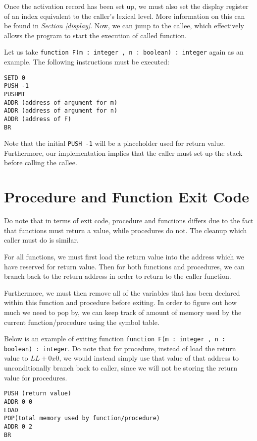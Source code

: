 \documentclass{article}
\begin{document}
Once the activation record has been set up, we must also set the display register of an index equivalent to the caller's lexical level. More information on this can be found in {\it Section \ref{display}}. Now, we can jump to the callee, which effectively allows the program to start the execution of called function.

Let us take {\tt function F(m : integer , n : boolean) : integer} again as an example. The following instructions must be executed:

\begin{lstlisting}
SETD 0
PUSH -1
PUSHMT
ADDR (address of argument for m)
ADDR (address of argument for n)
ADDR (address of F)
BR
\end{lstlisting}

Note that the initial {\tt PUSH -1} will be a placeholder used for return value. Furthermore, our implementation implies that the caller must set up the stack before calling the callee.

\section{Procedure and Function Exit Code} \label{exit}

Do note that in terms of exit code, procedure and functions differs due to the fact that functions must return a value, while procedures do not. The cleanup which caller must do is similar.

For all functions, we must first load the return value into the address which we have reserved for return value. Then for both functions and procedures, we can branch back to the return address in order to return to the caller function.

Furthermore, we must then remove all of the variables that has been declared within this function and procedure before exiting. In order to figure out how much we need to pop by, we can keep track of amount of memory used by the current function/procedure using the symbol table.

Below is an example of exiting function {\tt function F(m : integer , n : boolean) : integer}. Do note that for procedure, instead of load the return value to $LL + 0x0$, we would instead simply use that value of that address to unconditionally branch back to caller, since we will not be storing the return value for procedures.

\begin{lstlisting}
PUSH (return value)
ADDR 0 0
LOAD
POP(total memory used by function/procedure)
ADDR 0 2
BR
\end{lstlisting}
\end{document}
